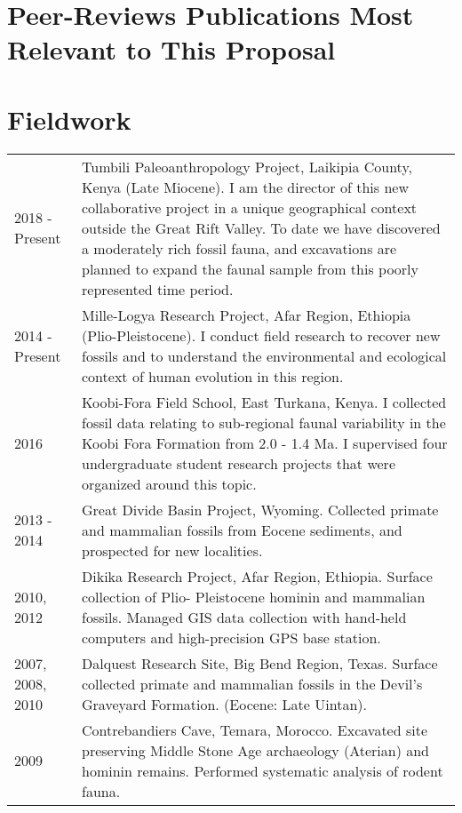 \documentclass{article}
\begin{document}
\section*{Peer-Reviews Publications Most Relevant to This Proposal}

\begin{itemize}[label={},leftmargin=*]

\end{itemize}








\section*{Fieldwork }
\begin{longtable}{p{}p{}}

2018 - Present & Tumbili Paleoanthropology Project, Laikipia County, Kenya (Late Miocene). I am the director of this new collaborative project in a unique geographical context outside the Great Rift Valley. To date we have discovered a moderately rich fossil fauna, and excavations are planned to expand the faunal sample from this poorly represented time period.\\[4pt]

2014 - Present & Mille-Logya Research Project, Afar Region, Ethiopia (Plio-Pleistocene). I conduct field research to recover new fossils and to understand the environmental and ecological context of human evolution in this region. \\[4pt]

2016 & Koobi-Fora Field School, East Turkana, Kenya. I collected fossil data relating to sub-regional faunal variability in the Koobi Fora Formation from 2.0 - 1.4 Ma. I supervised four undergraduate student research projects that were organized around this topic. \\[4pt]


2013 - 2014 & Great Divide Basin Project, Wyoming. Collected primate and mammalian fossils from Eocene sediments, and prospected for new localities. \\[4pt]

2010, 2012 & Dikika Research Project, Afar Region, Ethiopia. Surface collection of Plio- Pleistocene hominin and mammalian fossils. Managed GIS data collection with hand-held computers and high-precision GPS base station.\\[4pt]

2007, 2008, 2010 & Dalquest Research Site, Big Bend Region, Texas. Surface collected primate and mammalian fossils in the Devil's Graveyard Formation. (Eocene: Late Uintan).\\[4pt]

2009 & Contrebandiers Cave, Temara, Morocco.  Excavated site preserving Middle Stone Age archaeology (Aterian) and hominin remains. Performed systematic analysis of rodent fauna.\\
\end{longtable}
\end{document}
